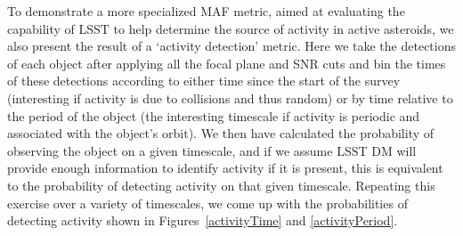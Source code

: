 \documentclass{iau}
\begin{document}
To demonstrate a more specialized MAF metric, aimed at evaluating the
capability of LSST to help determine the source of activity in active
asteroids, we also present the result of a `activity detection'
metric. Here we take the detections of each object after applying all
the focal plane and SNR cuts and bin the times of these detections
according to either time since the start of the survey (interesting if
activity is due to collisions and thus random) or by time relative to the
period of the object (the interesting timescale if activity is
periodic and associated with the object's orbit). We
then have calculated the probability of observing the object on a
given timescale, and if we assume LSST DM will provide enough
information to identify activity if it is present, this is equivalent
to the probability of detecting activity on that given
timescale. Repeating this exercise over a variety of timescales, we
come up with the probabilities of detecting activity shown in
Figures~\ref{activityTime} and \ref{activityPeriod}.
\end{document}
